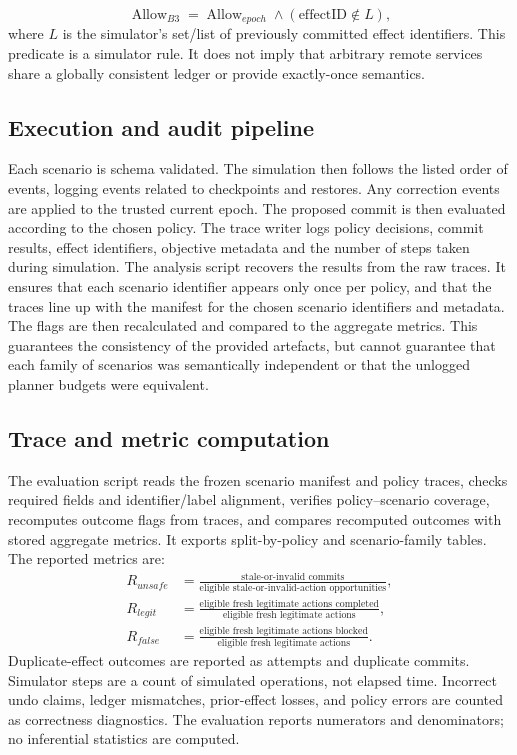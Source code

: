 \documentclass[conference]{IEEEtran}
\begin{document}
\begin{equation}
\operatorname{Allow}_{B3}=\operatorname{Allow}_{epoch}\land(\text{effectID}\notin L),
\end{equation}
where $L$ is the simulator's set/list of previously committed effect identifiers. This predicate is a simulator rule. It does not imply that arbitrary remote services share a globally consistent ledger or provide exactly-once semantics.

\subsection{Execution and audit pipeline}
Each scenario is schema validated. The simulation then follows the listed order of events, logging events related to checkpoints and restores. Any correction events are applied to the trusted current epoch. The proposed commit is then evaluated according to the chosen policy. The trace writer logs policy decisions, commit results, effect identifiers, objective metadata and the number of steps taken during simulation. The analysis script recovers the results from the raw traces. It ensures that each scenario identifier appears only once per policy, and that the traces line up with the manifest for the chosen scenario identifiers and metadata. The flags are then recalculated and compared to the aggregate metrics. This guarantees the consistency of the provided artefacts, but cannot guarantee that each family of scenarios was semantically independent or that the unlogged planner budgets were equivalent.

\subsection{Trace and metric computation}
The evaluation script reads the frozen scenario manifest and policy traces, checks required fields and identifier/label alignment, verifies policy--scenario coverage, recomputes outcome flags from traces, and compares recomputed outcomes with stored aggregate metrics. It exports split-by-policy and scenario-family tables. The reported metrics are:
\begin{align}
R_{unsafe} &= \frac{\text{stale-or-invalid commits}}{\text{eligible stale-or-invalid-action opportunities}},\\
R_{legit} &= \frac{\text{eligible fresh legitimate actions completed}}{\text{eligible fresh legitimate actions}},\\
R_{false} &= \frac{\text{eligible fresh legitimate actions blocked}}{\text{eligible fresh legitimate actions}}.
\end{align}
Duplicate-effect outcomes are reported as attempts and duplicate commits. Simulator steps are a count of simulated operations, not elapsed time. Incorrect undo claims, ledger mismatches, prior-effect losses, and policy errors are counted as correctness diagnostics. The evaluation reports numerators and denominators; no inferential statistics are computed.
\end{document}
